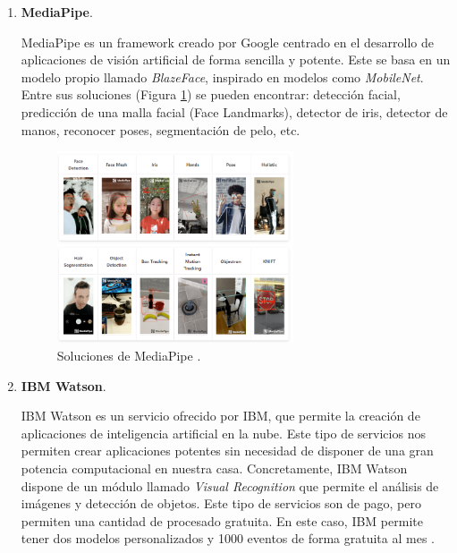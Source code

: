 \begin{enumerate}
	\item \textbf{MediaPipe}.
	
	MediaPipe \cite{mediapipe} es un framework creado por Google centrado en el desarrollo de aplicaciones de visión artificial de forma sencilla y potente. Este se basa en un modelo propio llamado \textit{BlazeFace}, inspirado en modelos como \textit{MobileNet}. Entre sus soluciones (Figura \ref{fig:solMed}) se pueden encontrar: detección facial, predicción de una malla facial (Face Landmarks), detector de iris, detector de manos, reconocer poses, segmentación de pelo, etc.
	
	\begin{figure}[htp]
		\centering
		\includegraphics[width=7cm]{imagenes/solucionesMediaPipe.png}
		\caption{Soluciones de MediaPipe \cite{mdSolutions}.}
		\label{fig:solMed}
	\end{figure}
	
	\item \textbf{IBM Watson}.
	
	IBM Watson es un servicio ofrecido por IBM, que permite la creación de aplicaciones de inteligencia artificial en la nube. Este tipo de servicios nos permiten crear aplicaciones potentes sin necesidad de disponer de una gran potencia computacional en nuestra casa. Concretamente, IBM Watson dispone de un módulo llamado \textit{Visual Recognition} que permite el análisis de imágenes y detección de objetos. Este tipo de servicios son de pago, pero permiten una cantidad de procesado gratuita. En este caso, IBM permite tener dos modelos personalizados y 1000 eventos de forma gratuita al mes \cite{ibm}. 
\end{enumerate}



